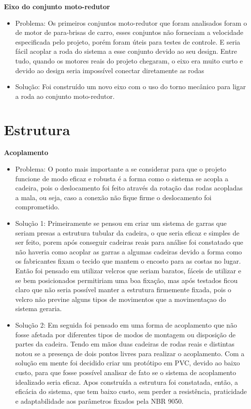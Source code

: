 \textbf{Eixo do conjunto moto-redutor}
 \begin{itemize}
  \item Problema: Os primeiros conjuntos moto-redutor que foram analisados foram o de motor de para-brisas de carro, esses conjuntos não forneciam a velocidade especificada pelo projeto, porém foram úteis para testes de controle. E seria fácil acoplar a roda do sistema a esse conjunto devido ao seu design. Entre tudo, quando os motores reais do projeto chegaram, o eixo era muito curto e devido ao design seria impossível conectar diretamente as rodas
  \item Solução: Foi construído um novo eixo com o uso do torno mecânico para ligar a roda ao conjunto moto-redutor.

 \end{itemize}

\section{Estrutura}

\textbf{Acoplamento}
 \begin{itemize}
  \item Problema: O ponto mais importante a se considerar para que o projeto funcione de modo eficaz e robusta é a forma como o sistema se acopla a cadeira, pois o deslocamento foi feito através da rotação das rodas acopladas a mala, ou seja, caso  a conexão não fique firme o deslocamento foi comprometido.
  \item Solução 1: Primeiramente se pensou em criar um sistema de garras que seriam presas a estrutura tubular da cadeira, o que seria eficaz e simples de ser feito, porem após conseguir cadeiras reais para análise foi constatado que não haveria como acoplar as garras a algumas cadeiras devido a forma como os fabricantes fixam o tecido que mantem o encosto para as costas no lugar. Então foi pensado em utilizar velcros que seriam baratos, fáceis de utilizar e se bem posicionados permitiriam uma boa fixação, mas após testados ficou claro que não seria possível manter a estrutura firmemente fixada, pois o velcro não previne alguns tipos de movimentos que a movimentaçao do sistema geraria.

  \item Solução 2: Em seguida foi pensado em uma forma de acoplamento que não fosse afetada por diferentes tipos de modos de montagem ou disposição de partes da cadeira. Tendo em mãos duas cadeiras de rodas reais e distintas notou se a presença de dois pontos livres para realizar o acoplamento. Com a solução em mente foi decidido criar um protótipo em PVC, devido ao baixo custo, para que fosse possível analisar de fato se o sistema de acoplamento idealizado seria eficaz. Apos construída a estrutura foi constatada, então, a eficácia do sistema, que tem baixo custo, sem perder a resistência, praticidade e adaptabilidade aos parâmetros fixados pela NBR 9050.
 \end{itemize}

